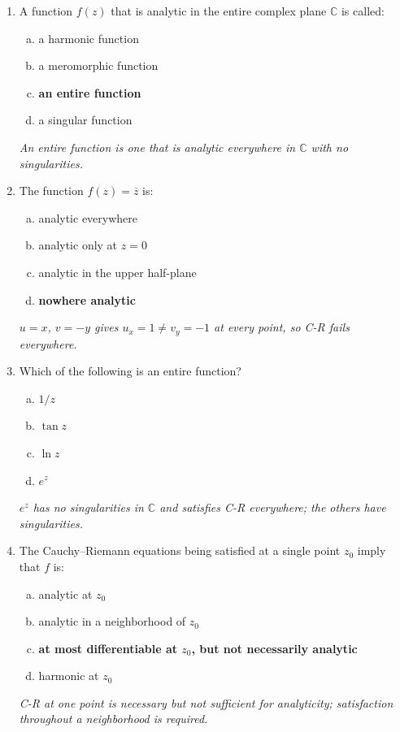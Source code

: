 \documentclass[12pt,a4paper]{article}
\begin{document}
\begin{enumerate}

  \item A function $f(z)$ that is analytic in the entire complex plane $\mathbb{C}$ is called:
  \begin{enumerate}[(a)]
    \item a harmonic function
    \item a meromorphic function
    \item \textbf{an entire function}
    \item a singular function
  \end{enumerate}
  \textit{An entire function is one that is analytic everywhere in $\mathbb{C}$ with no singularities.}

  \item The function $f(z) = \overline{z}$ is:
  \begin{enumerate}[(a)]
    \item analytic everywhere
    \item analytic only at $z = 0$
    \item analytic in the upper half-plane
    \item \textbf{nowhere analytic}
  \end{enumerate}
  \textit{$u = x$, $v = -y$ gives $u_x = 1 \neq v_y = -1$ at every point, so C-R fails everywhere.}

  \item Which of the following is an entire function?
  \begin{enumerate}[(a)]
    \item $1/z$
    \item $\tan z$
    \item $\ln z$
    \item \textbf{$e^{z}$}
  \end{enumerate}
  \textit{$e^{z}$ has no singularities in $\mathbb{C}$ and satisfies C-R everywhere; the others have singularities.}

  \item The Cauchy--Riemann equations being satisfied at a single point $z_0$ imply that $f$ is:
  \begin{enumerate}[(a)]
    \item analytic at $z_0$
    \item analytic in a neighborhood of $z_0$
    \item \textbf{at most differentiable at $z_0$, but not necessarily analytic}
    \item harmonic at $z_0$
  \end{enumerate}
  \textit{C-R at one point is necessary but not sufficient for analyticity; satisfaction throughout a neighborhood is required.}


\end{enumerate}
\end{document}
